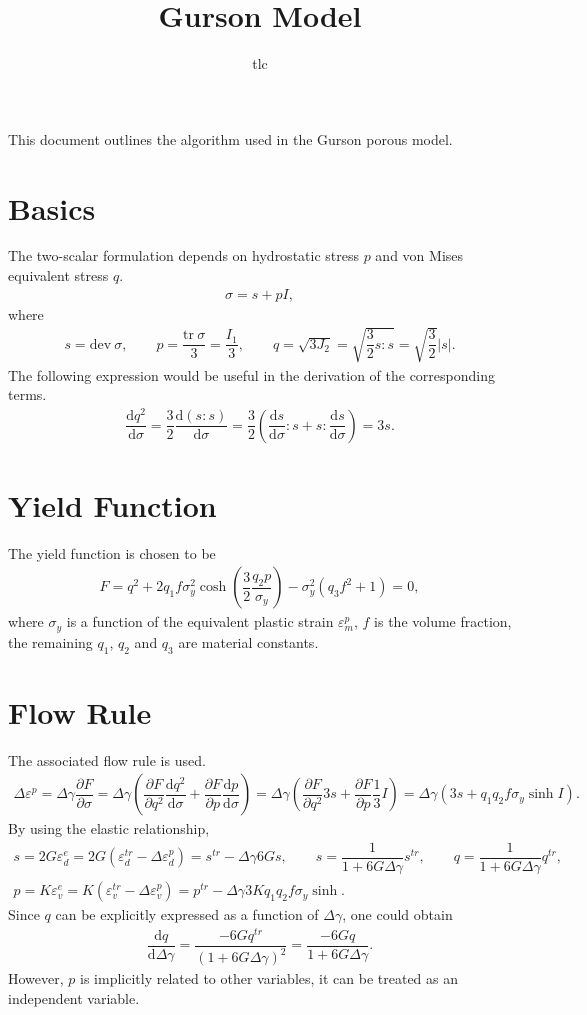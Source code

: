 \documentclass[10pt,fleqn,3p]{elsarticle}
\title{Gurson Model}\date{}\author{tlc}
\newcommand*{\md}[1]{\mathrm{d}#1}
\newcommand*{\tr}[1]{\mathrm{tr}~#1}
\newcommand*{\dev}[1]{\mathrm{dev}~#1}
\newcommand*{\ddfrac}[2]{\dfrac{\md#1}{\md#2}}
\newcommand*{\pfrac}[2]{\dfrac{\partial#1}{\partial#2}}
\begin{document}
\pagestyle{empty}
This document outlines the algorithm used in the Gurson porous model.
\section{Basics}
The two-scalar formulation depends on hydrostatic stress $p$ and von Mises equivalent stress $q$.
\begin{gather*}
\sigma=s+pI,
\end{gather*}
where
\begin{gather*}
s=\dev{\sigma},\qquad{}p=\dfrac{\tr{\sigma}}{3}=\dfrac{I_1}{3},\qquad{}q=\sqrt{3J_2}=\sqrt{\dfrac{3}{2}s:s}=\sqrt{\dfrac{3}{2}}|s|.
\end{gather*}
The following expression would be useful in the derivation of the corresponding terms.
\begin{gather*}
\ddfrac{q^2}{\sigma}=\dfrac{3}{2}\ddfrac{\left(s:s\right)}{\sigma}=\dfrac{3}{2}\left(\ddfrac{s}{\sigma}:s+s:\ddfrac{s}{\sigma}\right)=3s.
\end{gather*}
\section{Yield Function}
The yield function is chosen to be
\begin{gather*}
F=q^2+2q_1f\sigma_y^2\cosh\left(\dfrac{3}{2}\dfrac{q_2p}{\sigma_y}\right)-\sigma_y^2\left(q_3f^2+1\right)=0,
\end{gather*}
where $\sigma_y$ is a function of the equivalent plastic strain $\varepsilon^p_m$, $f$ is the volume fraction, the remaining $q_1$, $q_2$ and $q_3$ are material constants.
\section{Flow Rule}
The associated flow rule is used.
\begin{gather*}
\Delta\varepsilon^p=\Delta\gamma\pfrac{F}{\sigma}=\Delta\gamma\left(\pfrac{F}{q^2}\ddfrac{q^2}{\sigma}+\pfrac{F}{p}\ddfrac{p}{\sigma}\right)=\Delta\gamma\left(\pfrac{F}{q^2}3s+\pfrac{F}{p}\dfrac{1}{3}I\right)=\Delta\gamma\left(3s+q_1q_2f\sigma_y\sinh{}I\right).
\end{gather*}
By using the elastic relationship,
\begin{gather*}
s=2G\varepsilon^e_d=2G\left(\varepsilon^{tr}_d-\Delta\varepsilon^p_d\right)=s^{tr}-\Delta\gamma6Gs,\qquad
s=\dfrac{1}{1+6G\Delta\gamma}s^{tr},\qquad
q=\dfrac{1}{1+6G\Delta\gamma}q^{tr},\\
p=K\varepsilon^e_v=K\left(\varepsilon^{tr}_v-\Delta\varepsilon^p_v\right)=p^{tr}-\Delta\gamma3Kq_1q_2f\sigma_y\sinh.
\end{gather*}
Since $q$ can be explicitly expressed as a function of $\Delta\gamma$, one could obtain
\begin{gather*}
\ddfrac{q}{\Delta\gamma}=\dfrac{-6Gq^{tr}}{\left(1+6G\Delta\gamma\right)^2}=\dfrac{-6Gq}{1+6G\Delta\gamma}.
\end{gather*}
However, $p$ is implicitly related to other variables, it can be treated as an independent variable.
\end{document}
